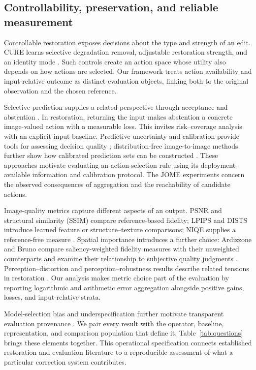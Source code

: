 \documentclass[12pt]{article}
\begin{document}
\subsection{Controllability, preservation, and reliable measurement}
Controllable restoration exposes decisions about the type and strength of an edit. CURE learns selective degradation removal, adjustable restoration strength, and an identity mode \citep{kim2026cure}. Such controls create an action space whose utility also depends on how actions are selected. Our framework treats action availability and input-relative outcome as distinct evaluation objects, linking both to the original observation and the chosen reference.

Selective prediction supplies a related perspective through acceptance and abstention \citep{elyaniv2010selective,geifman2019selectivenet}. In restoration, returning the input makes abstention a concrete image-valued action with a measurable loss. This invites risk--coverage analysis with an explicit input baseline. Predictive uncertainty and calibration provide tools for assessing decision quality \citep{lakshminarayanan2017ensembles,guo2017calibration}; distribution-free image-to-image methods further show how calibrated prediction sets can be constructed \citep{angelopoulos2022imaging}. These approaches motivate evaluating an action-selection rule using its deployment-available information and calibration protocol. The JOME experiments concern the observed consequences of aggregation and the reachability of candidate actions.

Image-quality metrics capture different aspects of an output. PSNR and structural similarity (SSIM) compare reference-based fidelity; LPIPS and DISTS introduce learned feature or structure--texture comparisons; NIQE supplies a reference-free measure \citep{wang2004ssim,zhang2018lpips,ding2020dists,mittal2013niqe}. Spatial importance introduces a further choice: Ardizzone and Bruno compare saliency-weighted fidelity measures with their unweighted counterparts and examine their relationship to subjective quality judgments \citep{ardizzone2012saliency}. Perception--distortion and perception--robustness results describe related tensions in restoration \citep{blau2018perception,ohayon2024robustness}. Our analysis makes metric choice part of the evaluation by reporting logarithmic and arithmetic error aggregation alongside positive gains, losses, and input-relative strata.

Model-selection bias and underspecification further motivate transparent evaluation provenance \citep{cawley2010selection,damour2022underspecification}. We pair every result with the operator, baseline, representation, and comparison population that define it. Table~\ref{tab:questions} brings these elements together. This operational specification connects established restoration and evaluation literature to a reproducible assessment of what a particular correction system contributes.
\end{document}

